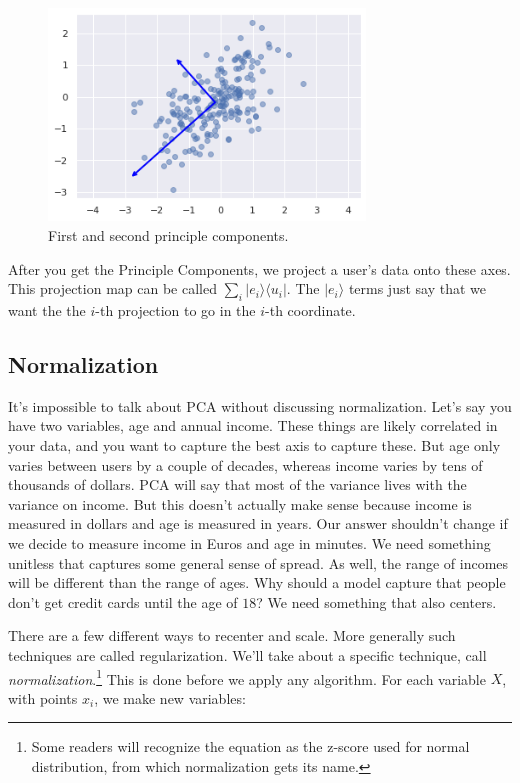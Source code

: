 \documentclass{amsbook}
\begin{document}
\begin{figure}
\caption{First and second principle components.}
\centering
\includegraphics[width=0.75\textwidth]{pca}
\end{figure}

After you get the Principle Components, we project a user's data onto these axes.  This projection map can be called $\sum_i |e_i\rangle\langle u_i|$.  The $|e_i\rangle$ terms just say that we want the the $i$-th projection to go in the $i$-th coordinate.

\subsection{Normalization}

It's impossible to talk about PCA without discussing normalization.  Let's say you have two variables, age and annual income.  These things are likely correlated in your data, and you want to capture the best axis to capture these.  But age only varies between users by a couple of decades, whereas income varies by tens of thousands of dollars.  PCA will say that most of the variance lives with the variance on income.  But this doesn't actually make sense because income is measured in dollars and age is measured in years.  Our answer shouldn't change if we decide to measure income in Euros and age in minutes.  We need something unitless that captures some general sense of spread.  As well, the range of incomes will be different than the range of ages.  Why should a model capture that people don't get credit cards until the age of $18$?  We need something that also centers.

There are a few different ways to recenter and scale.  More generally such techniques are called regularization.  We'll take about a specific technique, call {\em normalization}.\footnote{Some readers will recognize the equation as the z-score used for normal distribution, from which normalization gets its name.}  This is done before we apply any algorithm.  For each variable $X$, with points $x_i$, we make new variables:
\end{document}
